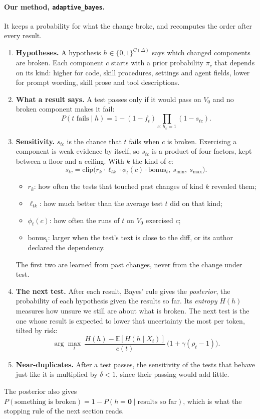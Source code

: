 \documentclass[11pt,a4paper]{article}
\newcommand{\strat}[1]{\texttt{#1}}
\begin{document}
\paragraph{Our method, \strat{adaptive\_bayes}.} It keeps a probability for what the change broke, and recomputes
the order after every result.
\begin{enumerate}
  \item \textbf{Hypotheses.} A hypothesis $h \in \{0,1\}^{C(\Delta)}$ says which changed components are broken.
        Each component $c$ starts with a prior probability $\pi_c$ that depends on its kind: higher for code,
        skill procedures, settings and agent fields, lower for prompt wording, skill prose and tool descriptions.
  \item \textbf{What a result says.} A test passes only if it would pass on $V_0$ and no broken component makes it
        fail:
        \[ P(t \text{ fails} \mid h) = 1 - (1 - f_t) \prod_{c:\, h_c = 1} (1 - s_{tc}). \]
  \item \textbf{Sensitivity.} $s_{tc}$ is the chance that $t$ fails when $c$ is broken. Exercising a component is
        weak evidence by itself, so $s_{tc}$ is a product of four factors, kept between a floor and a ceiling.
        With $k$ the kind of $c$:
        \[ s_{tc} = \mathrm{clip}\big(r_k \cdot \ell_{tk} \cdot \phi_t(c) \cdot \mathrm{bonus}_t,\ s_{\min},\
           s_{\max}\big). \]
        \begin{itemize}
          \item $r_k$: how often the tests that touched past changes of kind $k$ revealed them;
          \item $\ell_{tk}$: how much better than the average test $t$ did on that kind;
          \item $\phi_t(c)$: how often the runs of $t$ on $V_0$ exercised $c$;
          \item $\mathrm{bonus}_t$: larger when the test's text is close to the diff, or its author declared the
                dependency.
        \end{itemize}
        The first two are learned from past changes, never from the change under test.
  \item \textbf{The next test.} After each result, Bayes' rule gives the \emph{posterior}, the probability of each
        hypothesis given the results so far. Its \emph{entropy} $H(h)$ measures how unsure we still are about
        what is broken. The next test is the one whose result is expected to lower that uncertainty the most per
        token, tilted by risk:
        \[ \arg\max_t\ \frac{H(h) - \mathbb{E}[H(h \mid X_t)]}{c(t)}\, \big(1 + \gamma(\rho_t - 1)\big). \]
  \item \textbf{Near-duplicates.} After a test passes, the sensitivity of the tests that behave just like it is
        multiplied by $\delta < 1$, since their passing would add little.
\end{enumerate}
The posterior also gives $P(\text{something is broken}) = 1 - P(h = \mathbf{0} \mid \text{results so far})$, which
is what the stopping rule of the next section reads.
\end{document}
